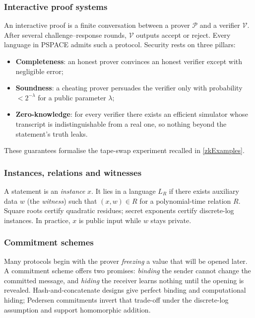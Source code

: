 \subsubsection{Interactive proof systems}\label{Chap2.3.formal}
An interactive proof is a finite conversation between a prover $\mathcal P$ and a verifier $\mathcal V$.  After several challenge–response rounds, $\mathcal V$ outputs \textsf{accept} or \textsf{reject}.  Every language in \textsf{PSPACE} admits such a protocol.  Security rests on three pillars:
\begin{itemize}
  \item \textbf{Completeness}: an honest prover convinces an honest verifier
        except with negligible error;
  \item \textbf{Soundness}: a cheating prover persuades the verifier only
        with probability $<2^{-\lambda}$ for a public parameter $\lambda$;
  \item \textbf{Zero-knowledge}: for every verifier there exists an
        efficient simulator whose transcript is indistinguishable from a
        real one, so nothing beyond the statement’s truth leaks.
\end{itemize}
These guarantees formalise the tape-swap experiment recalled in
\ref{zkExamples}.

\subsubsection{Instances, relations and witnesses}\label{Chap2.3.instances}
A statement is an \emph{instance} $x$.  It lies in a language $L_R$ if there exists auxiliary data $w$ (the \emph{witness}) such that $(x,w)\in R$ for a polynomial-time relation $R$.  Square roots certify quadratic residues; secret exponents certify discrete-log instances. In practice, $x$ is public input while $w$ stays private.

\subsubsection{Commitment schemes}\label{Chap2.3.commit}
Many protocols begin with the prover \emph{freezing} a value that will be opened later. A commitment scheme offers two promises: \emph{binding} the sender cannot change the committed message, and \emph{hiding} the receiver learns nothing until the opening is revealed. Hash-and-concatenate designs give perfect binding and computational hiding; Pedersen commitments invert that trade-off under the discrete-log assumption and support homomorphic addition.

